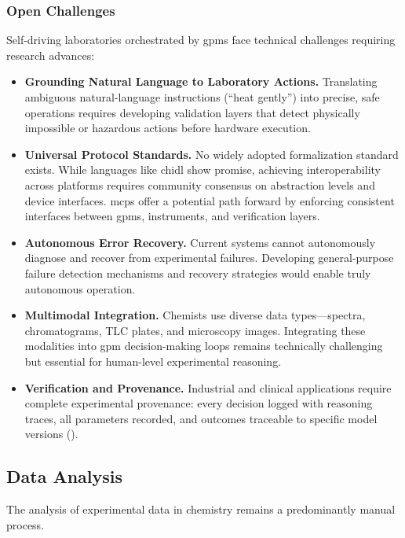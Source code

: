 \subsubsection{Open Challenges}
Self-driving laboratories orchestrated by \glspl{gpm} face technical challenges requiring research advances:\autocite{Tom2024SDL,Seifrid2022SDL}

\begin{itemize}
\item \textbf{Grounding Natural Language to Laboratory Actions.} Translating ambiguous natural-language instructions (\enquote{heat gently}) into precise, safe operations requires developing validation layers that detect physically impossible or hazardous actions before hardware execution.

\item \textbf{Universal Protocol Standards.} No widely adopted formalization standard exists. While languages like \gls{chidl} show promise, achieving interoperability across platforms requires community consensus on abstraction levels and device interfaces. \Glspl{mcp} offer a potential path forward by enforcing consistent interfaces between \glspl{gpm}, instruments, and verification layers.

\item \textbf{Autonomous Error Recovery.} Current systems cannot autonomously diagnose and recover from experimental failures. Developing general-purpose failure detection mechanisms and recovery strategies would enable truly autonomous operation.

\item \textbf{Multimodal Integration.} Chemists use diverse data types---spectra, chromatograms, TLC plates, and microscopy images. Integrating these modalities into \gls{gpm} decision-making loops remains technically challenging but essential for human-level experimental reasoning.

\item \textbf{Verification and Provenance.} Industrial and clinical applications require complete experimental provenance: every decision logged with reasoning traces, all parameters recorded, and outcomes traceable to specific model versions ().
\end{itemize}

\subsection{Data Analysis}
The analysis of experimental data in chemistry remains a predominantly manual process. 

